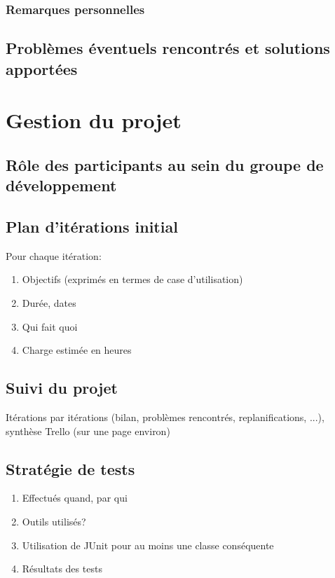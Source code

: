 \documentclass[a4paper,11pt]{article}
\begin{document}
	\subsubsection{Remarques personnelles}
	
	\subsection{Problèmes éventuels rencontrés et solutions apportées}
	
	
	\section{Gestion du projet}
	
	\subsection{Rôle des participants au sein du groupe de développement}
	
	\subsection{Plan d'itérations initial}
	Pour chaque itération:
	\begin{enumerate}
		\item Objectifs (exprimés en termes de case d'utilisation)
		\item Durée, dates
		\item Qui fait quoi
		\item Charge estimée en heures
	\end{enumerate}
	
	\subsection{Suivi du projet}
	Itérations par itérations (bilan, problèmes rencontrés, replanifications, ...), synthèse Trello (sur une page environ)
	
	\subsection{Stratégie de tests}
	\begin{enumerate}
		\item Effectués quand, par qui
		\item Outils utilisés?
		\item Utilisation de JUnit pour au moins une classe conséquente
		\item Résultats des tests
	\end{enumerate}
\end{document}
